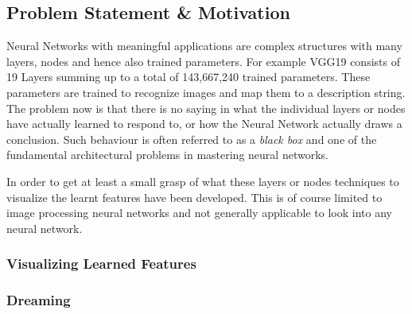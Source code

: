 \subsection{Problem Statement \& Motivation}
\label{sec:problem-statement}
Neural Networks with meaningful applications are complex structures with many layers, nodes and hence also trained parameters.
For example VGG19 consists of 19 Layers summing up to a total of 143,667,240 trained parameters\cite{vgg}. These parameters are trained to recognize images and map them to a description string.
The problem now is that there is no saying in what the individual layers or nodes have actually learned to respond to, or how the Neural Network actually draws a conclusion\cite{castelvecchi2016can}.
Such behaviour is often referred to as a \textit{black box} and one of the fundamental architectural problems in mastering neural networks\cite{olden2002illuminating}.

In order to get at least a small grasp of what these layers or nodes  techniques to visualize the learnt features have been developed.
This is of course limited to image processing neural networks and not generally applicable to look into any neural network.

\subsubsection{Visualizing Learned Features}

\subsubsection{Dreaming}

